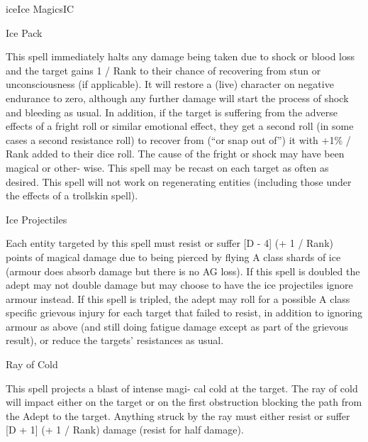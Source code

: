 \begin{College}[1.5]{ice}{Ice Magics}{IC}
\begin{spell}[S-10]{Ice Pack}
\begin{effects}
This spell immediately halts any damage being taken due to shock or
blood loss and the target gains 1 / Rank to their chance of recovering
from stun or unconsciousness (if applicable). It will restore a (live)
character on negative endurance to zero, although any further damage
will start the process of shock and bleeding as usual. In addition, if
the target is suffering from the adverse effects of a fright roll or
similar emotional effect, they get a second roll (in some cases a
second resistance roll) to recover from (“or snap out of”) it with
+1\% / Rank added to their dice roll.  The cause of the fright or
shock may have been magical or other- wise.  This spell may be recast
on each target as often as desired. This spell will not work on
regenerating entities (including those under the effects of a
trollskin spell).
\end{effects}
\end{spell}

\begin{spell}[S-11]{Ice Projectiles}

\begin{effects}
Each entity targeted by this spell must resist or suffer [D - 4] (+ 1
/ Rank) points of magical damage due to being pierced by flying A
class shards of ice (armour does absorb damage but there is no AG
loss).  If this spell is doubled the adept may not double damage but
may choose to have the ice projectiles ignore armour instead.  If this
spell is tripled, the adept may roll for a possible A class specific
grievous injury for each target that failed to resist, in addition to
ignoring armour as above (and still doing fatigue damage except as
part of the grievous result), or reduce the targets’ resistances as
usual.
\end{effects}
\end{spell}

\begin{spell}[S-12]{Ray of Cold}
\begin{effects}
This spell projects a blast of intense magi- cal cold at the target.
The ray of cold will impact either on the target or on the first
obstruction blocking the path from the Adept to the target.  Anything
struck by the ray must either resist or suffer [D + 1] (+ 1 / Rank)
damage (resist for half damage).
\end{effects}
\end{spell}


\end{College}
